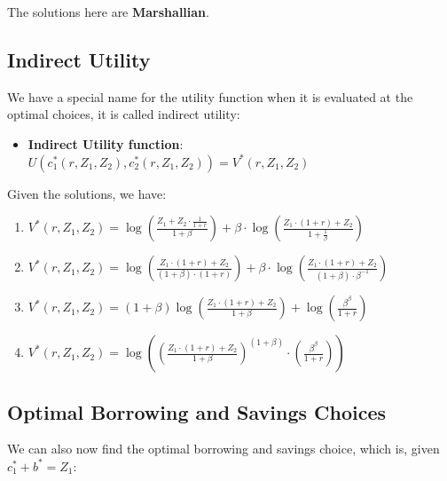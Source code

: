 \documentclass[
]{book}
\providecommand{\tightlist}{%
  \setlength{\itemsep}{0pt}\setlength{\parskip}{0pt}}
\begin{document}
The solutions here are \textbf{Marshallian}.

\hypertarget{indirect-utility}{%
\subsection{Indirect Utility}\label{indirect-utility}}

We have a special name for the utility function when it is evaluated at
the optimal choices, it is called indirect utility:

\begin{itemize}
\tightlist
\item
  \textbf{Indirect Utility function}:
  \(U(c_1^{\ast } (r,Z_1 ,Z_2 ),c_2^{\ast } (r,Z_1 ,Z_2 ))=V^{\ast } (r,Z_1 ,Z_2 )\)
\end{itemize}

Given the solutions, we have:

\begin{enumerate}
\def\labelenumi{\arabic{enumi}.}
\item
  \(\displaystyle V^{\ast } (r,Z_1 ,Z_2 )=\log \left(\frac{Z_1 +Z_2 \cdot \frac{1}{1+r}}{1+\beta }\right)+\beta \cdot \log \left(\frac{Z_1 \cdot (1+r)+Z_2 }{1+\frac{1}{\beta }}\right)\)
\item
  \(\displaystyle V^{\ast } (r,Z_1 ,Z_2 )=\log \left(\frac{Z_1 \cdot \left(1+r\right)+Z_2 }{\left(1+\beta \right)\cdot \left(1+r\right)}\right)+\beta \cdot \log \left(\frac{Z_1 \cdot (1+r)+Z_2 }{\left(1+\beta \right)\cdot \beta^{-1} }\right)\)
\item
  \(\displaystyle V^{\ast } (r,Z_1 ,Z_2 )=\left(1+\beta \right)\log \left(\frac{Z_1 \cdot \left(1+r\right)+Z_2 }{1+\beta }\right)+\log \left(\frac{\beta^{\beta } }{1+r}\right)\)
\item
  \(\displaystyle V^{\ast } (r,Z_1 ,Z_2 )=\log \left({\left(\frac{Z_1 \cdot \left(1+r\right)+Z_2 }{1+\beta }\right)}^{\left(1+\beta \right)} \cdot \left(\frac{\beta^{\beta } }{1+r}\right)\right)\)
\end{enumerate}

\hypertarget{optimal-borrowing-and-savings-choices}{%
\subsection{Optimal Borrowing and Savings Choices}\label{optimal-borrowing-and-savings-choices}}

We can also now find the optimal borrowing and savings choice, which is,
given \(c_1^{\ast } +b^{\ast } =Z_1\):
\end{document}
